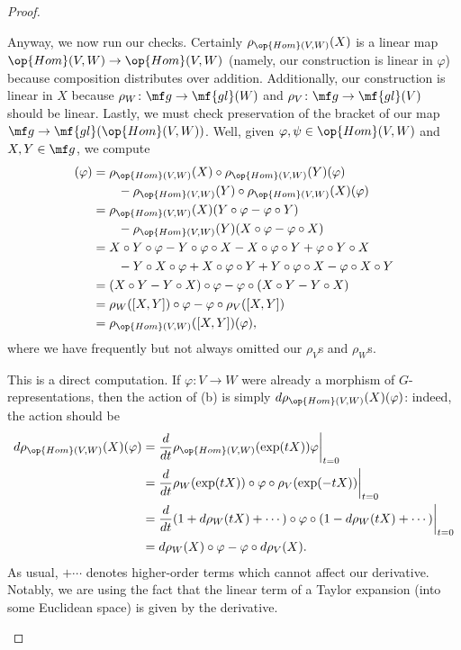 \documentclass[../notes.tex]{subfiles}
\begin{document}
\begin{proof}
\begin{listalph}
		Anyway, we now run our checks. Certainly $\rho_{\op{Hom}(V,W)}(X)$ is a linear map $\op{Hom}(V,W)\to\op{Hom}(V,W)$ (namely, our construction is linear in $\varphi$) because composition distributes over addition. Additionally, our construction is linear in $X$ because $\rho_W\colon\mf g\to\mf{gl}(W)$ and $\rho_V\colon\mf g\to\mf{gl}(V)$ should be linear. Lastly, we must check preservation of the bracket of our map $\mf g\to\mf{gl}(\op{Hom}(V,W))$. Well, given $\varphi,\psi\in\op{Hom}(V,W)$ and $X,Y\in\mf g$, we compute
		\begin{align*}
			[\rho_{\op{Hom}(V,W)}(X),\rho_{\op{Hom}(V,W)}(Y)](\varphi) &= \rho_{\op{Hom}(V,W)}(X)\circ\rho_{\op{Hom}(V,W)}(Y)(\varphi)\\
			&\qquad-\rho_{\op{Hom}(V,W)}(Y)\circ\rho_{\op{Hom}(V,W)}(X)(\varphi) \\
			&= \rho_{\op{Hom}(V,W)}(X)(Y\circ\varphi-\varphi\circ Y) \\
			&\qquad-\rho_{\op{Hom}(V,W)}(Y)(X\circ\varphi-\varphi\circ X) \\
			&= X\circ Y\circ\varphi-Y\circ\varphi\circ X-X\circ\varphi\circ Y+\varphi\circ Y\circ X \\
			&\qquad-Y\circ X\circ\varphi+X\circ\varphi\circ Y+Y\circ\varphi\circ X-\varphi\circ X\circ Y \\
			&= (X\circ Y-Y\circ X)\circ\varphi-\varphi\circ(X\circ Y-Y\circ X) \\
			&= \rho_W([X,Y])\circ\varphi-\varphi\circ\rho_V([X,Y]) \\
			&= \rho_{\op{Hom}(V,W)}([X,Y])(\varphi),
		\end{align*}
		where we have frequently but not always omitted our $\rho_V$s and $\rho_W$s.

		\item This is a direct computation. If $\varphi\colon V\to W$ were already a morphism of $G$-representations, then the action of (b) is simply $d\rho_{\op{Hom}(V,W)}(X)(\varphi)$: indeed, the action should be
		\begin{align*}
			d\rho_{\op{Hom}(V,W)}(X)(\varphi) &= \frac d{dt}\rho_{\op{Hom}(V,W)}(\exp(tX))\varphi\bigg|_{t=0} \\
			&= \frac d{dt}\rho_W(\exp(tX))\circ\varphi\circ\rho_V(\exp(-tX))\bigg|_{t=0} \\
			&= \frac d{dt}(1+d\rho_W(tX)+\cdots)\circ\varphi\circ(1-d\rho_W(tX)+\cdots)\bigg|_{t=0} \\
			&= d\rho_W(X)\circ\varphi-\varphi\circ d\rho_V(X).
		\end{align*}
		As usual, $+\cdots$ denotes higher-order terms which cannot affect our derivative. Notably, we are using the fact that the linear term of a Taylor expansion (into some Euclidean space) is given by the derivative.
		\qedhere
	\end{listalph}
\end{proof}
\end{document}
